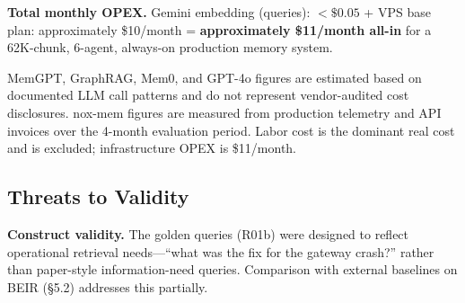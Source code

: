 \textbf{Total monthly OPEX.} Gemini embedding (queries): $<\$0.05$ + VPS base plan:
approximately \$10/month = \textbf{approximately \$11/month all-in} for a 62K-chunk,
6-agent, always-on production memory system.

\begin{table}[h]
  \caption{Cost comparison: nox-mem vs.\ alternative memory architectures (estimated
    2026-Q1 pricing, small single-team deployment).}
  \label{tab:cost}
  \centering
  \begin{minipage}{\linewidth}
    \vspace{4pt}\footnotesize
    MemGPT, GraphRAG, Mem0, and GPT-4o figures are estimated based on documented LLM call
    patterns and do not represent vendor-audited cost disclosures. nox-mem figures are
    measured from production telemetry and API invoices over the 4-month evaluation period.
    Labor cost is the dominant real cost and is excluded; infrastructure OPEX is
    \$11/month.
  \end{minipage}
\end{table}

\subsection{Threats to Validity}

\textbf{Construct validity.} The golden queries (R01b) were designed to reflect operational
retrieval needs---``what was the fix for the gateway crash?'' rather than paper-style
information-need queries. Comparison with external baselines on BEIR (\S5.2) addresses
this partially.

